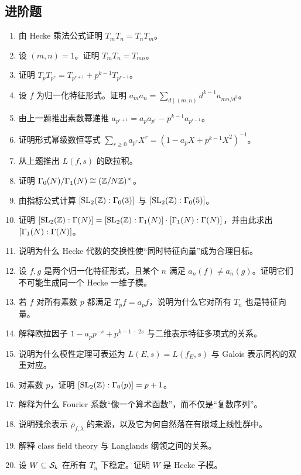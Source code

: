 \subsection*{进阶题}
\begin{enumerate}[resume, label=\textbf{\arabic*.}, leftmargin=*, itemsep=0.5em]
\item \medium 由 Hecke 乘法公式证明 $T_mT_n=T_nT_m$。
\item \medium 设 $(m,n)=1$。证明 $T_mT_n=T_{mn}$。
\item \medium 证明 $T_pT_{p^r}=T_{p^{r+1}}+p^{k-1}T_{p^{r-1}}$。
\item \medium 设 $f$ 为归一化特征形式。证明
$a_ma_n=\sum_{d\mid(m,n)}d^{k-1}a_{mn/d^2}$。
\item \medium 由上一题推出素数幂递推
$a_{p^{r+1}}=a_pa_{p^r}-p^{k-1}a_{p^{r-1}}$。
\item \medium 证明形式幂级数恒等式
$\sum_{r\ge 0}a_{p^r}X^r=(1-a_pX+p^{k-1}X^2)^{-1}$。
\item \medium 从上题推出 $L(f,s)$ 的欧拉积。
\item \medium 证明 $\Gamma_0(N)/\Gamma_1(N)\cong (\mathbb{Z}/N\mathbb{Z})^\times$。
\item \medium 由指标公式计算 $[\mathrm{SL}_2(\mathbb{Z}):\Gamma_0(3)]$ 与 $[\mathrm{SL}_2(\mathbb{Z}):\Gamma_0(5)]$。
\item \medium 证明 $[\mathrm{SL}_2(\mathbb{Z}):\Gamma(N)] = [\mathrm{SL}_2(\mathbb{Z}):\Gamma_1(N)]\cdot [\Gamma_1(N):\Gamma(N)]$，并由此求出 $[\Gamma_1(N):\Gamma(N)]$。
\item \medium 说明为什么 Hecke 代数的交换性使“同时特征向量”成为合理目标。
\item \medium 设 $f,g$ 是两个归一化特征形式，且某个 $n$ 满足 $a_n(f)\ne a_n(g)$。证明它们不可能生成同一个 Hecke 一维子模。
\item \medium 若 $f$ 对所有素数 $p$ 都满足 $T_pf=a_pf$，说明为什么它对所有 $T_n$ 也是特征向量。
\item \medium 解释欧拉因子
$1-a_pp^{-s}+p^{k-1-2s}$
与二维表示特征多项式的关系。
\item \medium 说明为什么模性定理可表述为 $L(E,s)=L(f_E,s)$ 与 Galois 表示同构的双重对应。
\item \medium 对素数 $p$，证明 $[\mathrm{SL}_2(\mathbb{Z}):\Gamma_0(p)]=p+1$。
\item \medium 解释为什么 Fourier 系数“像一个算术函数”，而不仅是“复数序列”。
\item \medium 说明残余表示 $\bar\rho_{f,\lambda}$ 的来源，以及它为何自然落在有限域上线性群中。
\item \medium 解释 class field theory 与 Langlands 纲领之间的关系。
\item \medium 设 $W\subseteq \mathcal{S}_k$ 在所有 $T_n$ 下稳定。证明 $W$ 是 Hecke 子模。
\end{enumerate}
